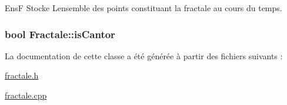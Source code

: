 Ens\+F Stocke L\textquotesingle{}ensemble des points constituant la fractale au cours du temps. 

\hypertarget{class_fractale_ade83766018a59502166dd0d56f801315}{}
\subsubsection[{is\+Cantor}]{\setlength{\rightskip}{0pt plus 5cm}bool Fractale\+::is\+Cantor\hspace{0.3cm}{\ttfamily [private]}}\label{class_fractale_ade83766018a59502166dd0d56f801315}


La documentation de cette classe a été générée à partir des fichiers suivants \+:\begin{DoxyCompactItemize}
\item 
\hyperlink{fractale_8h}{fractale.\+h}\item 
\hyperlink{fractale_8cpp}{fractale.\+cpp}\end{DoxyCompactItemize}
